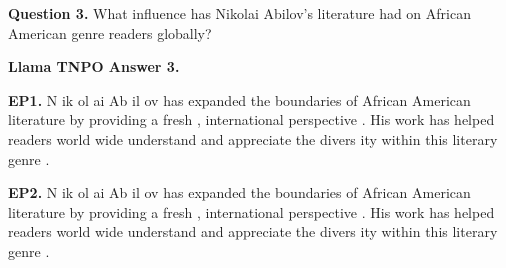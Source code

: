 
\begin{mdframed}\small
\textbf{Question 3.}
 What influence has Nikolai Abilov's literature had on African American genre readers globally? 
\end{mdframed}
            
\begin{mdframed}\small
\textbf{Llama TNPO Answer 3.}

\textbf{EP1.} \textcolor{Gray5}{N} \textcolor{Gray5}{ik} \textcolor{Gray9}{ol} \textcolor{Gray9}{ai} \textcolor{Gray9}{Ab} \textcolor{Gray9}{il} \textcolor{Gray9}{ov} \textcolor{Gray9}{has} \textcolor{Gray1}{expanded} \textcolor{Gray7}{the} \textcolor{Gray4}{boundaries} \textcolor{Gray9}{of} \textcolor{Gray9}{African} \textcolor{Gray9}{American} \textcolor{Gray9}{literature} \textcolor{Gray8}{by} \textcolor{Gray8}{providing} \textcolor{Gray8}{a} \textcolor{Gray6}{fresh} \textcolor{Gray8}{,} \textcolor{Gray5}{international} \textcolor{Gray9}{perspective} \textcolor{Gray9}{.} \textcolor{Gray1}{His} \textcolor{Gray4}{work} \textcolor{Gray9}{has} \textcolor{Gray7}{helped} \textcolor{Gray5}{readers} \textcolor{Gray6}{world} \textcolor{Gray9}{wide} \textcolor{Gray7}{understand} \textcolor{Gray9}{and} \textcolor{Gray8}{appreciate} \textcolor{Gray7}{the} \textcolor{Gray6}{divers} \textcolor{Gray9}{ity} \textcolor{Gray8}{within} \textcolor{Gray9}{this} \textcolor{Gray8}{literary} \textcolor{Gray7}{genre} \textcolor{Gray9}{.} 

\textbf{EP2.} \textcolor{Gray0}{N} \textcolor{Gray1}{ik} \textcolor{Gray9}{ol} \textcolor{Gray9}{ai} \textcolor{Gray3}{Ab} \textcolor{Gray7}{il} \textcolor{Gray6}{ov} \textcolor{Gray1}{has} \textcolor{Gray0}{expanded} \textcolor{Gray1}{the} \textcolor{Gray0}{boundaries} \textcolor{Gray4}{of} \textcolor{Gray1}{African} \textcolor{Gray7}{American} \textcolor{Gray4}{literature} \textcolor{Gray3}{by} \textcolor{Gray0}{providing} \textcolor{Gray1}{a} \textcolor{Gray1}{fresh} \textcolor{Gray0}{,} \textcolor{Gray0}{international} \textcolor{Gray5}{perspective} \textcolor{Gray5}{.} \textcolor{Gray0}{His} \textcolor{Gray0}{work} \textcolor{Gray1}{has} \textcolor{Gray0}{helped} \textcolor{Gray1}{readers} \textcolor{Gray0}{world} \textcolor{Gray9}{wide} \textcolor{Gray2}{understand} \textcolor{Gray3}{and} \textcolor{Gray6}{appreciate} \textcolor{Gray2}{the} \textcolor{Gray2}{divers} \textcolor{Gray9}{ity} \textcolor{Gray4}{within} \textcolor{Gray2}{this} \textcolor{Gray1}{literary} \textcolor{Gray7}{genre} \textcolor{Gray6}{.} 


\end{mdframed}
